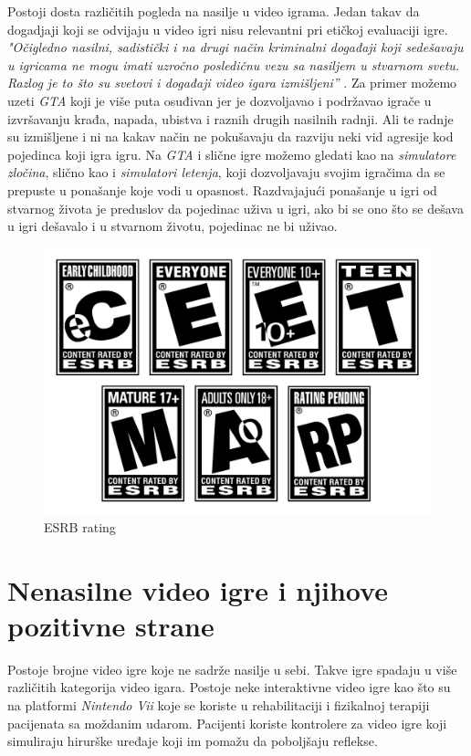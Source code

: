 \documentclass[a4paper]{article}
\begin{document}
Postoji dosta različitih pogleda na nasilje u video igrama. Jedan takav da dogadjaji koji se odvijaju
u video igri nisu relevantni pri etičkoj evaluaciji igre. {\em "Očigledno nasilni, sadistički i na drugi način kriminalni događaji koji sedešavaju u igricama ne mogu imati uzročno posledičnu vezu sa nasiljem u stvarnom svetu. Razlog je to što su svetovi i događaji video igara izmišljeni''} \cite{tavinor}. Za primer možemo uzeti {\em GTA} koji je
više puta osuđivan jer je dozvoljavao i podržavao igrače u izvršavanju krađa, napada, ubistva i raznih drugih nasilnih radnji.
Ali te radnje su izmišljene i ni na kakav način ne pokušavaju da razviju neki vid agresije kod pojedinca koji igra igru.
Na {\em GTA} i slične igre možemo gledati kao na {\em simulatore zločina}, slično kao i  {\em simulatori letenja},
koji dozvoljavaju svojim igračima da se prepuste u ponašanje koje vodi u opasnost. Razdvajajući ponašanje u igri
od stvarnog života je preduslov da pojedinac uživa u igri, ako bi se ono što se dešava u igri dešavalo i u stvarnom životu,
pojedinac ne bi uživao.

\begin{figure}[h!]
	\begin{center}
		\includegraphics[scale=0.2]{ESRB.jpg}
	\end{center}
	\caption{ESRB rating}
\end{figure}

\newpage

\section{Nenasilne video igre i njihove pozitivne strane}	
\label{sec:nenasilne}
Postoje brojne video igre koje ne sadrže nasilje u sebi. Takve igre spadaju u više različitih
kategorija video igara. Postoje neke interaktivne video igre kao što su na platformi {\em Nintendo Vii} koje se
koriste u rehabilitaciji i fizikalnoj terapiji pacijenata sa moždanim udarom. Pacijenti koriste kontrolere za video igre koji simuliraju
hirurške uređaje koji im pomažu da poboljšaju reflekse.
\end{document}
